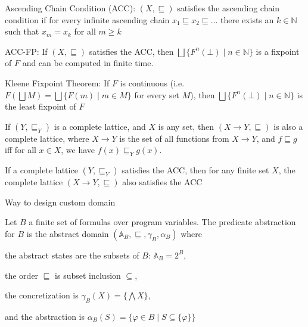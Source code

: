 \documentclass[landscape, a4paper]{article}
\begin{document}
\begin{minipage}[t]{0.2\linewidth}
\begin{betterlist}
\begin{betterlist}
			\item \color{orange}\alert{Ascending Chain Condition (ACC)}: $(X, \sqsubseteq)$ satisfies the \alert{ascending chain condition} if for every infinite ascending chain $x_1 \sqsubseteq x_2 \sqsubseteq \ldots$ there exists an $k \in \mathbb{N}$ such that $x_m = x_k$ for all $m \ge k$\color{black}
			\item \color{orange}\alert{ACC-FP}: If $(X, \sqsubseteq)$ satisfies the ACC, then $\bigsqcup\{F^n(\bot) \mid n \in  \mathbb{N}\}$ is a fixpoint of $F$ and can be computed in finite time. \color{black}
			\item \color{orange}\alert{Kleene Fixpoint Theorem}: If $F$ is continuous (i.e. $F(\bigsqcup M) = \bigsqcup \{F(m) \mid m \in M\}$ for every set $M$), then $\bigsqcup\{F^n(\bot) \mid n \in \mathbb{N}\}$ is the least fixpoint of $F$\color{black}
			\item {}
		\end{betterlist}
		\item If $(Y, \sqsubseteq_Y)$ is a complete lattice, and $X$ is any set, then $(X\rightarrow Y, \sqsubseteq)$ is also a complete lattice, where $X \rightarrow Y$ is the set of all functions from $X \rightarrow Y$, and $f \sqsubseteq g$ iff for all $x \in X$, we have $f(x) \sqsubseteq_Y g(x)$. 
		\item If a complete lattice $(Y , \sqsubseteq_Y)$ satisfies the ACC, then for any finite set $X$, the complete lattice $(X \rightarrow Y , \sqsubseteq)$ also satisfies the ACC
	\end{betterlist}
	\begin{betterlist}
		\item Way to design custom domain
		\item \color{orange}Let $B$ a finite set of formulas over program variables. The \alert{predicate abstraction for $B$} is the abstract domain $(\mathbb{A}_B, \sqsubseteq, \gamma_B, \alpha_B)$ where
		\begin{betterlist}
			\item the abstract states are the subsets of $B$: $\mathbb{A}_B = 2^B$,
			\item the order $\sqsubseteq$ is subset inclusion $\subseteq$,
			\item the concretization is $\gamma_B(X) = \{\bigwedge X\}$,
			\item and the abstraction is $\alpha_B(S) = \{\varphi \in B \mid S \subseteq \{\varphi\}\}$
		\end{betterlist}\color{black}

\end{betterlist}
\end{minipage}
\end{document}
